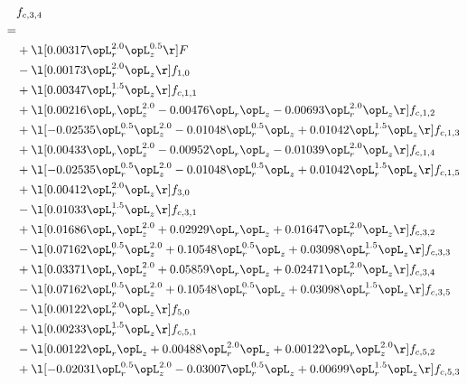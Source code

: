 \begin{alignat}{2} 
\label{eq:f_34_1} 
& f_{c,3,4} \nonumber \\ 
 = \\ 
& + \l[  0.00317 \opL_r^{2.0} \opL_z^{0.5}  \r] F \nonumber \\ 
& - \l[  0.00173 \opL_r^{2.0} \opL_z  \r] f_{1,0} \nonumber \\ 
& + \l[  0.00347 \opL_r^{1.5} \opL_z  \r] f_{c,1,1} \nonumber \\ 
& + \l[  0.00216 \opL_r \opL_z^{2.0}   -0.00476 \opL_r \opL_z   -0.00693 \opL_r^{2.0} \opL_z  \r] f_{c,1,2} \nonumber \\ 
& + \l[  -0.02535 \opL_r^{0.5} \opL_z^{2.0}   -0.01048 \opL_r^{0.5} \opL_z +  0.01042 \opL_r^{1.5} \opL_z  \r] f_{c,1,3} \nonumber \\ 
& + \l[  0.00433 \opL_r \opL_z^{2.0}   -0.00952 \opL_r \opL_z   -0.01039 \opL_r^{2.0} \opL_z  \r] f_{c,1,4} \nonumber \\ 
& + \l[  -0.02535 \opL_r^{0.5} \opL_z^{2.0}   -0.01048 \opL_r^{0.5} \opL_z +  0.01042 \opL_r^{1.5} \opL_z  \r] f_{c,1,5} \nonumber \\ 
& + \l[  0.00412 \opL_r^{2.0} \opL_z  \r] f_{3,0} \nonumber \\ 
& - \l[  0.01033 \opL_r^{1.5} \opL_z  \r] f_{c,3,1} \nonumber \\ 
& + \l[  0.01686 \opL_r \opL_z^{2.0} +  0.02929 \opL_r \opL_z +  0.01647 \opL_r^{2.0} \opL_z  \r] f_{c,3,2} \nonumber \\ 
& - \l[  0.07162 \opL_r^{0.5} \opL_z^{2.0} +  0.10548 \opL_r^{0.5} \opL_z +  0.03098 \opL_r^{1.5} \opL_z  \r] f_{c,3,3} \nonumber \\ 
& + \l[  0.03371 \opL_r \opL_z^{2.0} +  0.05859 \opL_r \opL_z +  0.02471 \opL_r^{2.0} \opL_z  \r] f_{c,3,4} \nonumber \\ 
& - \l[  0.07162 \opL_r^{0.5} \opL_z^{2.0} +  0.10548 \opL_r^{0.5} \opL_z +  0.03098 \opL_r^{1.5} \opL_z  \r] f_{c,3,5} \nonumber \\ 
& - \l[  0.00122 \opL_r^{2.0} \opL_z  \r] f_{5,0} \nonumber \\ 
& + \l[  0.00233 \opL_r^{1.5} \opL_z  \r] f_{c,5,1} \nonumber \\ 
& - \l[  0.00122 \opL_r \opL_z +  0.00488 \opL_r^{2.0} \opL_z +  0.00122 \opL_r \opL_z^{2.0}  \r] f_{c,5,2} \nonumber \\ 
& + \l[  -0.02031 \opL_r^{0.5} \opL_z^{2.0}   -0.03007 \opL_r^{0.5} \opL_z +  0.00699 \opL_r^{1.5} \opL_z  \r] f_{c,5,3} \nonumber \\ 

\end{alignat}
